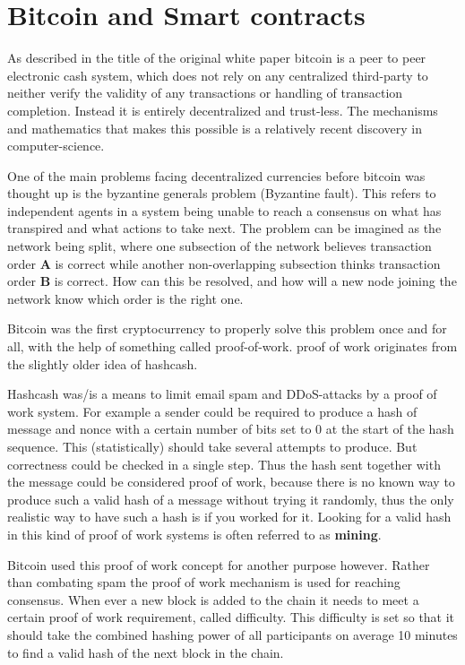 
\chapter{Bitcoin and Smart contracts}

As described in the title of the original white paper bitcoin is a peer to peer electronic cash system, which does not rely on any centralized third-party to neither verify the validity of any transactions or handling of transaction completion. Instead it is entirely decentralized and trust-less. The mechanisms and mathematics that makes this possible is a relatively recent discovery in computer-science. 

One of the main problems facing decentralized currencies before bitcoin was thought up is the byzantine generals problem (Byzantine fault). This refers to independent agents in a system being unable to reach a consensus on what has transpired and what actions to take next. The problem can be imagined as the network being split, where one subsection of the network believes transaction order \textbf{A} is correct while another non-overlapping subsection thinks transaction order \textbf{B} is correct. How can this be resolved, and how will a new node joining the network know which order is the right one.

Bitcoin was the first cryptocurrency to properly solve this problem once and for all, with the help of something called proof-of-work. proof of work originates from the slightly older idea of hashcash. 

Hashcash was/is a means to limit email spam and DDoS-attacks by a proof of work system. For example a sender could be required to produce a hash of message and nonce with a certain number of bits set to 0 at the start of the hash sequence. This (statistically) should take several attempts to produce. But correctness could be checked in a single step. Thus the hash sent together with the message could be considered proof of work, because there is no known way to produce such a valid hash of a message without trying it randomly, thus the only realistic way to have such a hash is if you worked for it. Looking for a valid hash in this kind of proof of work systems is often referred to as \textbf{mining}.

Bitcoin used this proof of work concept for another purpose however. Rather than combating spam the proof of work mechanism is used for reaching consensus. When ever a new block is added to the chain it needs to meet a certain proof of work requirement, called difficulty. This difficulty is set so that it should take the combined hashing power of all participants on average 10 minutes to find a valid hash of the next block in the chain.

